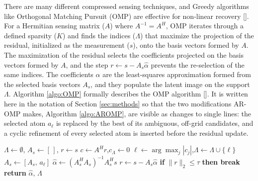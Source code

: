 There are many different compressed sensing techniques, and Greedy algorithms like Orthogonal Matching Pursuit (OMP) are effective for non-linear recovery []. For a Hermitian sensing matrix ($A$) where $A^{-1} = A^{H}$, OMP iterates through a defined sparsity ($K$) and finds the indices ($\Lambda$) that maximize the projection of the residual, initialized as the measurement ($s$), onto the basis vectors formed by $A$. The maximization of the residual selects the coefficients projected on the basis vectors formed by $A$, and the step $r \gets s - A_s\hat{\alpha}$ prevents the re-selection of the same indices. The coefficients $\hat{\alpha}$ are the least-squares approximation formed from the selected basis vectors $A_s$, and they populate the latent image on the support $\Lambda$. Algorithm \ref{algo:OMP} formally describes the OMP algorithm []. It is written here in the notation of Section \ref{sec:methods} so that the two modifications AR-OMP makes, Algorithm \ref{algo:AROMP}, are visible as changes to single lines: the selected atom $a_\ell$ is replaced by the best of its ambiguous, off-grid candidates, and a cyclic refinement of every selected atom is inserted before the residual update.

\begin{algorithm}[H]
\caption{Orthogonal Matching Pursuit}\label{algo:OMP}
\begin{algorithmic}[1]
\State $\Lambda \gets \emptyset$,\; $A_s \gets [\,]$,\; $r \gets s$
  \State $c \gets A^{H}r$,\quad $c_\Lambda \gets 0$
  \State $\ell \gets \arg\max_{j}|c_j|$,\quad $\Lambda \gets \Lambda \cup \{\ell\}$
  \State $A_s \gets [A_s,\, a_\ell]$
  \State $\hat{\alpha} \gets (A_s^{H}A_s)^{-1}A_s^{H}s$
  \State $r \gets s - A_s\hat{\alpha}$
  \State \textbf{if} $\|r\|_2 \leq \tau$ \textbf{then break}
\EndFor
\State \textbf{return} $\hat{\alpha},\, \Lambda$
\EndProcedure
\end{algorithmic}
\end{algorithm}